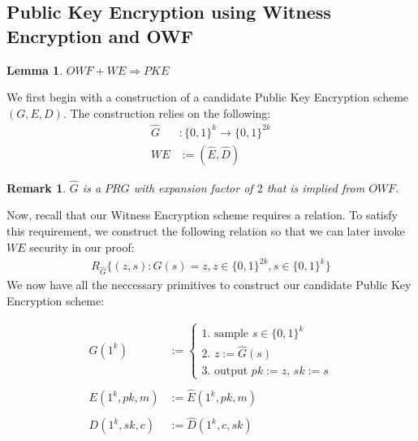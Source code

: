 \documentclass{article}
\newtheorem{lemma}[corollary]{Lemma}
\newtheorem{remark}[corollary]{Remark}
\begin{document}
\subsection{Public Key Encryption using Witness Encryption and OWF}
\begin{lemma}
$OWF + WE \Rightarrow PKE$
\end{lemma}
\noindent
We first begin with a construction of a candidate Public Key Encryption scheme $(G, E, D)$. The construction relies on the following:
    \begin{align*}
        \hat{G}&: \{0,1\}^k \rightarrow \{0,1\}^{2k} \\
        WE &:= (\hat{E}, \hat{D})
    \end{align*}
\begin{remark}
$\hat{G}$ is a $PRG$ with expansion factor of $2$ that is implied from $OWF$.
\end{remark}
\noindent Now, recall that our Witness Encryption scheme requires a relation. To satisfy this requirement, we construct the following relation so that we can later invoke $WE$ security in our proof:
\begin{align*}
    R_{\hat{G}}\{(z, s) : \hat{G}(s) = z, z \in \{0,1\}^{2k}, s \in \{0,1\}^k \}
\end{align*}
We now have all the neccessary primitives to construct our candidate Public Key Encryption scheme:
\begin{mdframed}%
    \begin{align*}
    G(1^k) &:= \begin{cases}
                    \text{1. sample $s \in\{0,1\}^k$} \\
                    \text{2. $z := \hat{G}(s)$} \\
                    \text{3. output $pk := z$, $sk := s$}
                \end{cases} \\ \\
    E(1^k, pk, m) &:= \hat{E}(1^k, pk, m) \\ \\
    D(1^k, sk, c) &:= \hat{D}(1^k, c, sk)
    \end{align*}
\end{mdframed}
\end{document}
